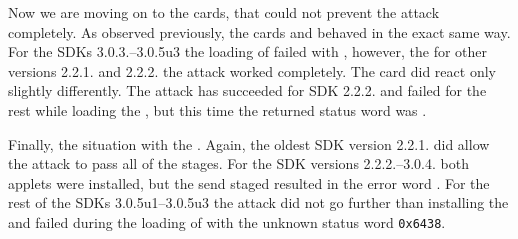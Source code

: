     Now we are moving on to the cards, that could not prevent the attack completely. As observed previously, the cards \Fcard and \Hcard behaved in the exact same way. For the SDKs 3.0.3.--3.0.5u3 the loading of \appletscap failed with \shortswwrongdata, however, the for other versions 2.2.1. and 2.2.2. the attack worked completely. The card \Inewcard did react only slightly differently. The attack has succeeded for SDK 2.2.2. and failed for the rest while loading the \appletscap, but this time the returned status word was \shortswconditionsnotsatisfied.

    Finally, the situation with the \Jcard. Again, the oldest SDK version 2.2.1. did allow the attack to pass all of the stages. For the SDK versions 2.2.2.--3.0.4. both applets were installed, but the send staged resulted in the error word \shortswinsnotsupported. For the rest of the SDKs 3.0.5u1--3.0.5u3 the attack did not go further than installing the \vulnscap and failed during the loading of \appletscap with the unknown status word \texttt{0x6438}.





